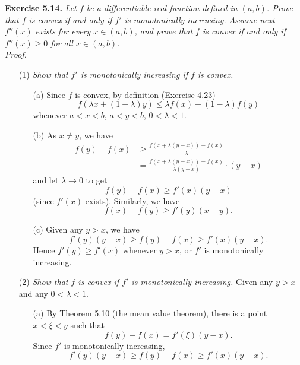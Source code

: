 \documentclass{article}
\begin{document}



\textbf{Exercise 5.14.}
\emph{Let $f$ be a differentiable real function defined in $(a,b)$.
Prove that $f$ is convex if and only if $f'$ is monotonically increasing.
Assume next $f''(x)$ exists for every $x \in (a,b)$,
and prove that $f$ is convex if and only if $f''(x) \geq 0$ for all $x \in (a,b)$.} \\

\emph{Proof.}
\begin{enumerate}
\item[(1)]
  \emph{Show that $f'$ is monotonically increasing if $f$ is convex.}
  \begin{enumerate}
  \item[(a)]
  Since $f$ is convex, by definition (Exercise 4.23)
  \[
    f(\lambda x + (1-\lambda) y) \leq \lambda f(x) + (1-\lambda) f(y)
  \]
  whenever $a < x < b$, $a < y < b$, $0 < \lambda < 1$.

  \item[(b)]
  As $x \neq y$, we have
  \begin{align*}
    f(y) - f(x)
    &\geq \frac{f(x + \lambda(y-x)) - f(x)}{\lambda} \\
    &= \frac{f(x + \lambda(y-x)) - f(x)}{\lambda(y-x)} \cdot (y-x)
  \end{align*}
  and let $\lambda \to 0$ to get
  \[
    f(y) - f(x) \geq f'(x)(y - x)
  \]
  (since $f'(x)$ exists).
  Similarly, we have
  \[
    f(x) - f(y) \geq f'(y)(x - y).
  \]

  \item[(c)]
  Given any $y > x$, we have
  \[
    f'(y)(y - x) \geq f(y) - f(x) \geq f'(x)(y - x).
  \]
  Hence $f'(y) \geq f'(x)$ whenever $y > x$,
  or $f'$ is monotonically increasing.
  \end{enumerate}

\item[(2)]
  \emph{Show that $f$ is convex if $f'$ is monotonically increasing.}
  Given any $y > x$ and any $0 < \lambda < 1$.
  \begin{enumerate}
  \item[(a)]
  By Theorem 5.10 (the mean value theorem), there is a point $x < \xi < y$ such that
  \[
    f(y) - f(x) = f'(\xi)(y - x).
  \]
  Since $f'$ is monotonically increasing,
  \[
    f'(y)(y - x) \geq f(y) - f(x) \geq f'(x)(y - x).
  \]


\end{enumerate}
\end{enumerate}
\end{document}
